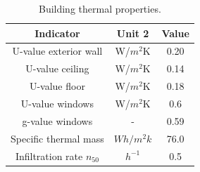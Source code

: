 \documentclass[twocolumn, a4paper,10pt]{article}
\begin{document}
\begin{table}[ht]
\vspace{-5pt}   %
\caption{Building thermal properties.}
\label{tab:properties}
\centering
\begin{tabular}{| c | c | c | }
  \hline
  \bf{Indicator} & \bf{Unit} 2 & \bf{Value} \\
  \hline
  U-value exterior wall & W/$m^2$K & 0.20 \\
  U-value ceiling & W/$m^2$K & 0.14 \\
  U-value floor & W/$m^2$K & 0.18 \\
  U-value windows & W/$m^2$K & 0.6 \\
  g-value windows & - & 0.59 \\  
  Specific thermal mass & $Wh/m^{2}k$ & 76.0 \\
  Infiltration rate $n_{50}$ & $h^{-1}$ & 0.5 \\
  \hline
\end{tabular}
\vspace{-5pt}   %
\end{table}

\end{document}
